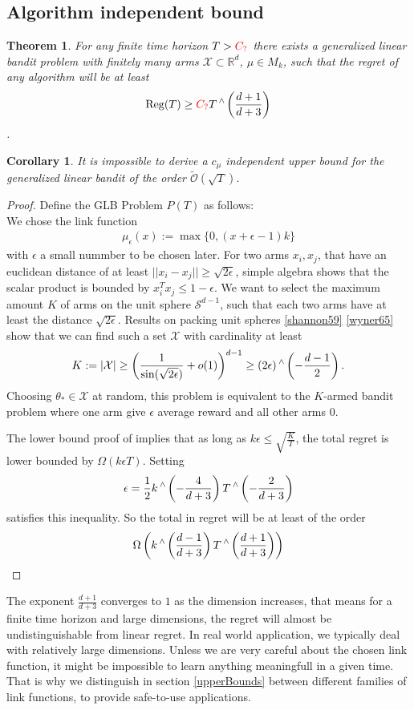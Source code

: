 \documentclass[twoside]{article} \usepackage{aistats2017}
\DeclareMathOperator\caret{\raisebox{1ex}{$\scriptstyle\wedge$}}
\newcommand{\Reg} {
  \operatorname{Reg}}
\newtheorem{theorem}{Theorem}
\newtheorem{corollary}{Corollary}[theorem]
\newcommand{\uc}{
\color{red}C_?\color{black}
}
\begin{document}
\subsection{Algorithm independent bound}
\begin{theorem}
For any finite time horizon $T>\uc$ there exists a generalized linear bandit problem with finitely many arms $\mathcal{X}\subset\mathbb{R}^d$, $\mu\in M_k$, such that the regret of any algorithm will be at least
$$\Reg(T) \geq \uc T\caret\left(\frac{d+1}{d+3}\right)$$.
\end{theorem}
\begin{corollary}
It is impossible to derive a $c_\mu$ independent upper bound for the generalized linear bandit of the order $\tilde{\mathcal{O}}(\sqrt{T})$.
\end{corollary}
\begin{proof}
    Define the GLB Problem $P(T)$ as follows:\\
    We chose the link function 
    \begin{align}
        \mu_\epsilon(x) := \max\{0, (x+\epsilon-1)k\}
    \end{align}
    with $\epsilon$ a small nummber to be chosen later. For two arms $x_i,x_j$, that have an euclidean distance of at least $||x_i-x_j||\geq\sqrt{2\epsilon}$, simple algebra shows that the scalar product is bounded by $x_i^Tx_j \leq 1-\epsilon$. We want to select the maximum amount $K$ of arms on the unit sphere $\mathcal{S}^{d-1}$, such that each two arms have at least the distance $\sqrt{2\epsilon}$. Results on packing
     unit spheres \ref{shannon59} \ref{wyner65} show that we can find such a set $\mathcal{X}$ with cardinality at least
     $$K:=|\mathcal{X}| \geq \left(\frac{1}{\sin(\sqrt{2\epsilon})}+o(1)\right)^{d-1}\geq (2\epsilon)\caret\left(-\frac{d-1}{2}\right).$$
     Choosing $\theta_*\in \mathcal{X}$ at random, this problem is equivalent to the $K$-armed bandit problem where one arm give $\epsilon$ average reward and all other arms $0$.
     
     The lower bound proof of \cite{Auer} implies that as long as $k\epsilon\leq \sqrt{\frac{K}{T}}$, the total regret is lower bounded by $\Omega(k\epsilon T)$. Setting
     $$\epsilon = \frac{1}{2}k\caret\left(-\frac{4}{d+3}\right)T\caret\left(-\frac{2}{d+3}\right)$$
     satisfies this inequality. So the total in regret will be at least of the order
     $$\Omega \left(k\caret\left(\frac{d-1}{d+3}\right)T\caret\left(\frac{d+1}{d+3}\right)\right)$$
    
\end{proof}
The exponent $\frac{d+1}{d+3}$ converges to $1$ as the dimension increases, that means for a finite time horizon and large dimensions, the regret will almost be undistinguishable from linear regret. 
In real world application, we typically deal with relatively large dimensions. 
Unless we are very careful about the chosen link function, it might be impossible to learn anything meaningfull in a given time.
That is why we distinguish in section \ref{upperBounds} between different families of link functions, to provide safe-to-use applications.
\end{document}
